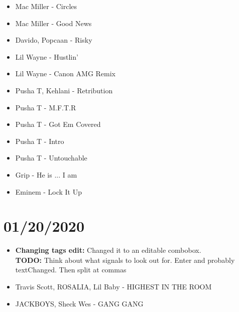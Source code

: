\documentclass{article}
\begin{document}
\begin{itemize}
	\item Mac Miller - Circles
	\item Mac Miller - Good News
	\item Davido, Popcaan - Risky
	\item Lil Wayne - Hustlin'
	\item Lil Wayne - Canon AMG Remix
	\item Pusha T, Kehlani - Retribution
	\item Pusha T - M.F.T.R
	\item Pusha T - Got Em Covered
	\item Pusha T - Intro
	\item Pusha T - Untouchable
	\item Grip - He is ... I am
	\item Eminem - Lock It Up
\end{itemize}

\section{01/20/2020}
\begin{itemize}
	\item \textbf{Changing tags edit: }Changed it to an editable combobox.\\
	\textbf{TODO: }Think about what signals to look out for. Enter and probably textChanged. Then split at commas
\end{itemize}
\begin{itemize}
	\item Travis Scott, ROSALIA, Lil Baby - HIGHEST IN THE ROOM
	\item JACKBOYS, Sheck Wes - GANG GANG 
\end{itemize}
\end{document}
